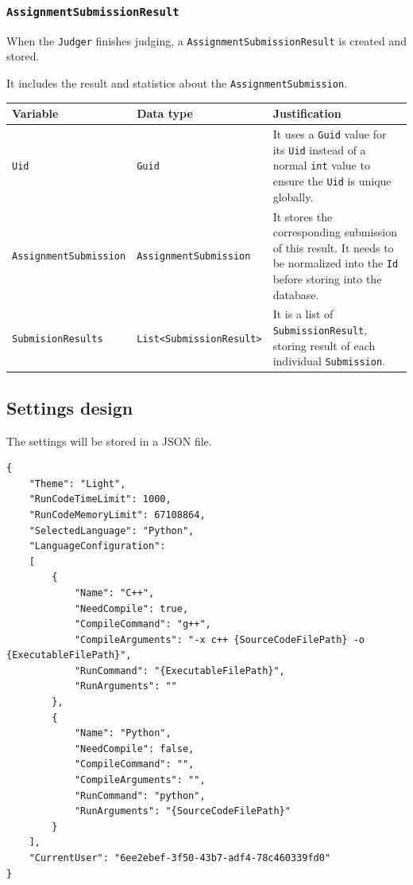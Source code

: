 \documentclass[a4paper]{report}
\begin{document}
\subsubsection{\texttt{AssignmentSubmissionResult}}

When the \texttt{Judger} finishes judging, a \texttt{AssignmentSubmissionResult} is created and stored.

It includes the result and statistics about the \texttt{AssignmentSubmission}.

\begin{tabulary}{\textwidth}{|l|l|L|}
    \hline
    Variable & Data type & Justification \\
    \hline
    \texttt{Uid} & \texttt{Guid} & It uses a \texttt{Guid} value for its \texttt{Uid} instead of a normal \texttt{int} value to ensure the \texttt{Uid} is unique globally. \\
    \hline
    \texttt{AssignmentSubmission} & \texttt{AssignmentSubmission} & It stores the corresponding submission of this result. It needs to be normalized into the \texttt{Id} before storing into the database. \\
    \hline
    \texttt{SubmisionResults} & \texttt{List<SubmissionResult>} & It is a list of \texttt{SubmissionResult}, storing result of each individual \texttt{Submission}. \\
    \hline
\end{tabulary}

\subsection{Settings design}

The settings will be stored in a JSON file.

\begin{verbatim}
{
    "Theme": "Light",
    "RunCodeTimeLimit": 1000,
    "RunCodeMemoryLimit": 67108864,
    "SelectedLanguage": "Python",
    "LanguageConfiguration": 
    [
        {
            "Name": "C++",
            "NeedCompile": true,
            "CompileCommand": "g++",
            "CompileArguments": "-x c++ {SourceCodeFilePath} -o {ExecutableFilePath}",
            "RunCommand": "{ExecutableFilePath}",
            "RunArguments": ""
        },
        {
            "Name": "Python",
            "NeedCompile": false,
            "CompileCommand": "",
            "CompileArguments": "",
            "RunCommand": "python",
            "RunArguments": "{SourceCodeFilePath}"
        }
    ],
    "CurrentUser": "6ee2ebef-3f50-43b7-adf4-78c460339fd0"
}
\end{verbatim}
\end{document}
